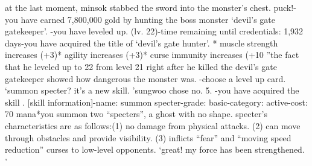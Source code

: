 at the last moment, minsok stabbed the sword into the monster’s chest.
puck!-you have earned 7,800,000 gold by hunting the boss monster ‘devil’s gate gatekeeper’.
-you have leveled up.
 (lv.
 22)-time remaining until credentials: 1,932 days-you have acquired the title of ‘devil’s gate hunter’.
* muscle strength increases (+3)* agility increases (+3)* curse immunity increases (+10%
”the fact that he leveled up to 22 from level 21 right after he killed the devil’s gate gatekeeper showed how dangerous the monster was.
-choose a level up card.
‘summon specter? it’s a new skill.
’sungwoo chose no.
 5.
-you have acquired the skill .
[skill information]-name: summon specter-grade: basic-category: active-cost: 70 mana*you summon two “specters”, a ghost with no shape.
 specter’s characteristics are as follows:(1) no damage from physical attacks.
 (2) can move through obstacles and provide visibility.
 (3) inflicts “fear” and “moving speed reduction” curses to low-level opponents.
‘great! my force has been strengthened.
’

 